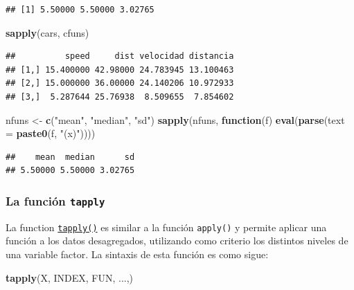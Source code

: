 \documentclass[]{book}
\newenvironment{Shaded}{\begin{snugshade}}{\end{snugshade}}
\newcommand{\KeywordTok}[1]{\textcolor[rgb]{0.13,0.29,0.53}{\textbf{#1}}}
\newcommand{\DataTypeTok}[1]{\textcolor[rgb]{0.13,0.29,0.53}{#1}}
\newcommand{\StringTok}[1]{\textcolor[rgb]{0.31,0.60,0.02}{#1}}
\newcommand{\ControlFlowTok}[1]{\textcolor[rgb]{0.13,0.29,0.53}{\textbf{#1}}}
\newcommand{\NormalTok}[1]{#1}
\begin{document}
\begin{verbatim}
## [1] 5.50000 5.50000 3.02765
\end{verbatim}

\begin{Shaded}
\begin{Highlighting}[]
\KeywordTok{sapply}\NormalTok{(cars, cfuns)}
\end{Highlighting}
\end{Shaded}

\begin{verbatim}
##          speed     dist velocidad distancia
## [1,] 15.400000 42.98000 24.783945 13.100463
## [2,] 15.000000 36.00000 24.140206 10.972933
## [3,]  5.287644 25.76938  8.509655  7.854602
\end{verbatim}

\begin{Shaded}
\begin{Highlighting}[]
\NormalTok{nfuns <-}\StringTok{ }\KeywordTok{c}\NormalTok{(}\StringTok{"mean"}\NormalTok{, }\StringTok{"median"}\NormalTok{, }\StringTok{"sd"}\NormalTok{)}
\KeywordTok{sapply}\NormalTok{(nfuns, }\ControlFlowTok{function}\NormalTok{(f) }\KeywordTok{eval}\NormalTok{(}\KeywordTok{parse}\NormalTok{(}\DataTypeTok{text =} \KeywordTok{paste0}\NormalTok{(f, }\StringTok{"(x)"}\NormalTok{))))}
\end{Highlighting}
\end{Shaded}

\begin{verbatim}
##    mean  median      sd 
## 5.50000 5.50000 3.02765
\end{verbatim}

\subsubsection{\texorpdfstring{La función
\texttt{tapply}}{La función tapply}}\label{la-funcion-tapply}

La function
\href{https://www.rdocumentation.org/packages/base/versions/3.6.1/topics/tapply}{\texttt{tapply()}}
es similar a la función \texttt{apply()} y permite aplicar una función a
los datos desagregados, utilizando como criterio los distintos niveles
de una variable factor. La sintaxis de esta función es como sigue:

\begin{Shaded}
\begin{Highlighting}[]
    \KeywordTok{tapply}\NormalTok{(X, INDEX, FUN, ...,)}
\end{Highlighting}
\end{Shaded}
\end{document}
